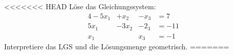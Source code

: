 




<<<<<<< HEAD
Löse das Gleichungssystem:
\begin{alignat*}{4}
	-5x_1& +x_2& -x_3& = 7\\
	5x_1&  -3x_2& -2_3& = -11\\
	x_1& & x_3& =-1
\end{alignat*}
Interpretiere das LGS und die Lösungsmenge geometrisch.
=======

\begin{enumerate}

\end{enumerate}
\begin{lsg}{}
	\begin{enumerate}

\end{lsg}




